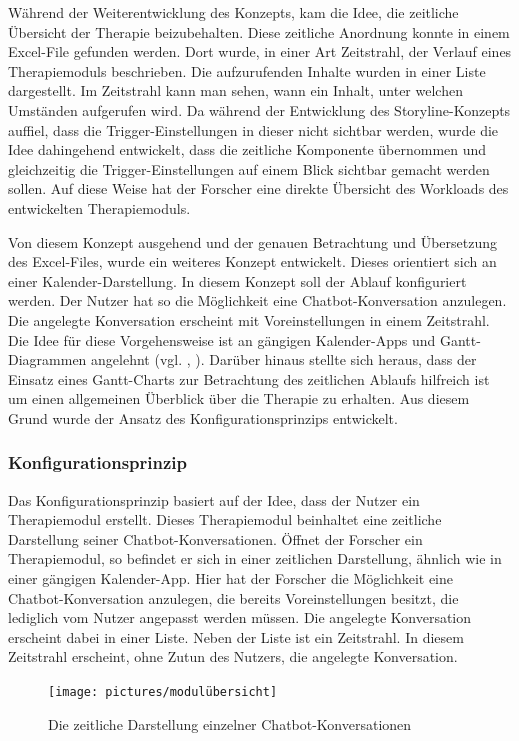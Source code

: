 Während der Weiterentwicklung des Konzepts, kam die Idee, die zeitliche Übersicht der Therapie beizubehalten. Diese zeitliche Anordnung konnte in einem Excel-File gefunden werden. Dort wurde, in einer Art Zeitstrahl, der Verlauf eines Therapiemoduls beschrieben. Die aufzurufenden Inhalte wurden in einer Liste dargestellt. Im Zeitstrahl kann man sehen, wann ein Inhalt, unter welchen Umständen aufgerufen wird. Da während der Entwicklung des Storyline-Konzepts auffiel, dass die Trigger-Einstellungen in dieser nicht sichtbar werden, wurde die Idee dahingehend entwickelt, dass die zeitliche Komponente übernommen und gleichzeitig die Trigger-Einstellungen auf einem Blick sichtbar gemacht werden sollen. Auf diese Weise hat der Forscher eine direkte Übersicht des Workloads des entwickelten Therapiemoduls. 

Von diesem Konzept ausgehend und der genauen Betrachtung und Übersetzung des Excel-Files, wurde ein weiteres Konzept entwickelt. Dieses orientiert sich an einer Kalender-Darstellung. In diesem Konzept soll der Ablauf konfiguriert werden. Der Nutzer hat so die Möglichkeit eine Chatbot-Konversation anzulegen. Die angelegte Konversation erscheint mit Voreinstellungen in einem Zeitstrahl. Die Idee für diese Vorgehensweise ist an gängigen Kalender-Apps und Gantt-Diagrammen angelehnt (vgl. \cite{GoogleKa75:online}, \cite{MailundK42:online}). Darüber hinaus stellte sich heraus, dass der Einsatz eines Gantt-Charts zur Betrachtung des zeitlichen Ablaufs hilfreich ist um einen allgemeinen Überblick über die Therapie zu erhalten. Aus diesem Grund wurde der Ansatz des Konfigurationsprinzips entwickelt. 

\subsubsection{Konfigurationsprinzip}
Das Konfigurationsprinzip basiert auf der Idee, dass der Nutzer ein Therapiemodul erstellt. Dieses Therapiemodul beinhaltet eine zeitliche Darstellung seiner Chatbot-Konversationen. Öffnet der Forscher ein Therapiemodul, so befindet er sich in einer zeitlichen Darstellung, ähnlich wie in einer gängigen Kalender-App. Hier hat der Forscher die Möglichkeit eine Chatbot-Konversation anzulegen, die bereits Voreinstellungen besitzt, die lediglich vom Nutzer angepasst werden müssen. Die angelegte Konversation erscheint dabei in einer Liste. Neben der Liste ist ein Zeitstrahl. In diesem Zeitstrahl erscheint, ohne Zutun des Nutzers, die angelegte Konversation.  


\begin{figure}[h]
\centering
\texttt{[image: pictures/modulübersicht]}
\caption{Die zeitliche Darstellung einzelner Chatbot-Konversationen}
\label{therapiedef}
\end{figure}

